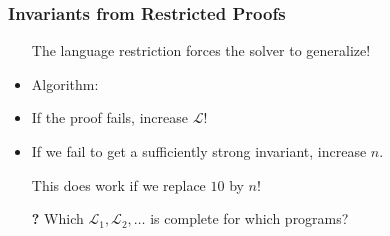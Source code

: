 
\begin{frame}
\frametitle{Invariants from Restricted Proofs}

\begin{itemize}

\item[\mycheck] The language restriction forces the solver to \alert{generalize}!
\vfill

\item Algorithm:
\end{itemize}

\begin{center}
\colorbox{tabutter!30}{\begin{minipage}{.7\textwidth}
\begin{itemize}
\item If the proof fails, increase $\mathcal L$!
\item If we fail to get a sufficiently strong invariant, increase $n$.
\end{itemize}
\end{minipage}}
\end{center}
\vfill

\begin{itemize}
\item[\mycheck] This does work if we replace $10$ by $n$!
\pause
\item[\bf\color{ta3skyblue}?] Which $\mathcal L_1, \mathcal L_2, \ldots$ is complete
for which programs?

\end{itemize}

\end{frame}



